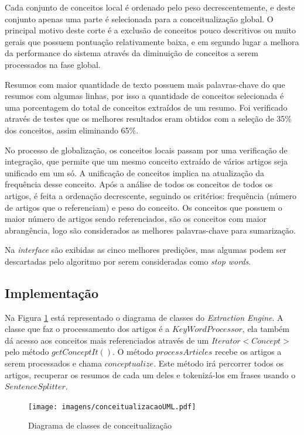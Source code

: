Cada conjunto de conceitos local é ordenado pelo peso decrescentemente, e deste conjunto apenas uma parte é selecionada para a conceitualização global. O principal motivo deste corte é a exclusão de conceitos pouco descritivos ou muito gerais que possuem pontuação relativamente baixa, e em segundo lugar a melhora da performance do sistema através da diminuição de conceitos a serem processados na fase global.

Resumos com maior quantidade de texto possuem mais palavras-chave do que resumos com algumas linhas, por isso a quantidade de conceitos selecionada é uma porcentagem do total de conceitos extraídos de um resumo. Foi verificado através de testes que os melhores resultados eram obtidos com a seleção de 35\% dos conceitos, assim eliminando 65\%.

No processo de globalização, os conceitos locais passam por uma verificação de integração, que permite que um mesmo conceito extraído de vários artigos seja unificado em um só. A unificação de conceitos implica na atualização da frequência desse conceito. Após a análise de todos os conceitos de todos os artigos, é feita a ordenação decrescente, seguindo os critérios: frequência (número de artigos que o referenciam) e peso do conceito. Os conceitos que possuem o maior número de artigos sendo referenciados, são os conceitos com maior abrangência, logo são considerados as melhores palavras-chave para sumarização.

Na \emph{interface} são exibidas as cinco melhores predições, mas algumas podem ser descartadas pelo algoritmo por serem consideradas como \emph{stop words}.

\subsection{Implementação}
Na Figura \ref{fig:conceitualizacaoUML} está representado o diagrama de classes do \emph{Extraction Engine}.
A classe que faz o processamento dos artigos é a $KeyWordProcessor$, ela também dá acesso aos conceitos mais referenciados através de um $Iterator<Concept>$ pelo método $getConceptIt()$. O método $processArticles$ recebe os artigos a serem processados e chama $conceptualize$. Este método irá percorrer todos os artigos, recuperar os resumos de cada um deles e tokenizá-los em frases usando o $SentenceSplitter$.

\begin{figure}[h!]
    \center
    \texttt{[image: imagens/conceitualizacaoUML.pdf]}
    \caption{Diagrama de classes de conceitualização\label{fig:conceitualizacaoUML}}
\end{figure}

